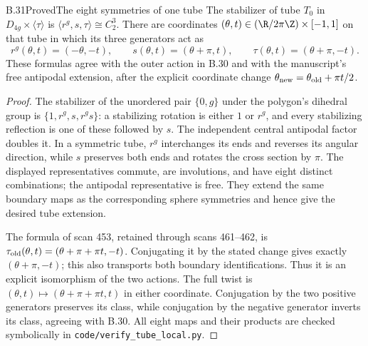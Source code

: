 \begin{claim}{B.31}{Proved}{The eight symmetries of one tube}
The stabilizer of tube $T_0$ in $D_{4g}\times\langle\tau\rangle$ is
$\langle r^g,s,\tau\rangle\cong C_2^3$. There are coordinates
$(\theta,t)\in(\R/2\pi\Z)\times[-1,1]$ on that tube in which its
three generators act as
\[
 r^g(\theta,t)=(-\theta,-t),\qquad
 s(\theta,t)=(\theta+\pi,t),\qquad
 \tau(\theta,t)=(\theta+\pi,-t).
\]
These formulas agree with the outer action in B.30 and with the
manuscript's free antipodal extension, after the explicit coordinate
change $\theta_{\rm new}=\theta_{\rm old}+\pi t/2$.
\end{claim}
\begin{proof}
The stabilizer of the unordered pair $\{0,g\}$ under the polygon's
dihedral group is $\{1,r^g,s,r^gs\}$: a stabilizing rotation is either
$1$ or $r^g$, and every stabilizing reflection is one of these followed
by $s$. The independent central antipodal factor doubles it. In a
symmetric tube, $r^g$ interchanges its ends and reverses its angular
direction, while $s$ preserves both ends and rotates the cross section
by $\pi$. The displayed representatives commute, are involutions,
and have eight distinct combinations; the antipodal representative
is free. They extend the same boundary maps as the corresponding
sphere symmetries and hence give the desired tube extension.

The formula of scan 453, retained through scans 461--462, is
$\tau_{\rm old}(\theta,t)=(\theta+\pi+\pi t,-t)$.
Conjugating it by the stated change gives exactly
$(\theta+\pi,-t)$; this also transports both boundary identifications.
Thus it is an explicit isomorphism of the two actions. The full twist
is $(\theta,t)\mapsto(\theta+\pi+\pi t,t)$ in either coordinate.
Conjugation by the two positive generators preserves its class, while
conjugation by the negative generator inverts its class, agreeing with
B.30. All eight maps and their products are checked symbolically in
\texttt{code/verify\_tube\_local.py}.
\end{proof}


